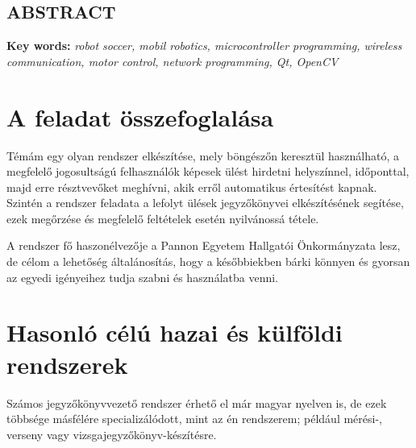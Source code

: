 \documentclass[a4paper,12pt,oneside]{report}
\begin{document}
\newpage

\begin{center}
\section*{\textbf{\Large \MakeUppercase{Abstract}}}
\end{center}


\vspace{2cm}

{\bf Key words:} {\it robot soccer, mobil robotics, microcontroller programming,
wireless communication, motor control, network programming, Qt, OpenCV }
\newpage
\setcounter{page}{1} %
\pagestyle{plain}

\listoftodos

\setcounter{secnumdepth}{3} %

\renewcommand{\thefigure}{\arabic{figure}}

\setcounter{tocdepth}{3} %
\tableofcontents
\thispagestyle{empty}
\pagebreak

\section{A feladat összefoglalása}

Témám egy olyan rendszer elkészítése, mely böngészőn keresztül használható, a megfelelő jogosultságú felhasználók képesek ülést hirdetni helyszínnel, időponttal, majd erre résztvevőket meghívni, akik erről automatikus értesítést kapnak. Szintén a rendszer feladata a lefolyt ülések jegyzőkönyvei elkészítésének segítése, ezek megőrzése és megfelelő feltételek esetén nyilvánossá tétele.

A rendszer fő haszonélvezője a Pannon Egyetem Hallgatói Önkormányzata lesz, de célom a lehetőség általánosítás, hogy a későbbiekben bárki könnyen és gyorsan az egyedi igényeihez tudja szabni és használatba venni.

\section{Hasonló célú hazai és külföldi rendszerek}

Számos jegyzőkönyvvezető rendszer érhető el már magyar nyelven is, de ezek többsége másfélére specializálódott, mint az én rendszerem; például mérési-, verseny vagy vizsgajegyzőkönyv-készítésre.
\end{document}
